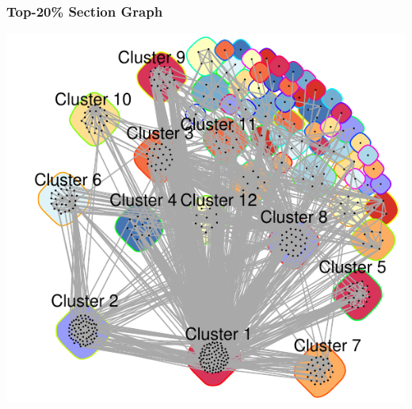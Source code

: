 \documentclass{beamer}
\begin{document}
\begin{frame}
\begin{columns}
\begin{column}{0.55\textwidth}
\begin{center}
\begin{tikzpicture}
\end{tikzpicture}
\end{center}
		\end{column}
	\end{columns}
\begin{center}


\end{center}
\end{frame}

	\begin{frame}
	\frametitle{Top-20\% Section Graph}
	\begin{center}
	\includegraphics[scale=0.6]{pics/final_graph_with_texts_cropped.pdf}
	\end{center}
	\end{frame}
\end{document}
